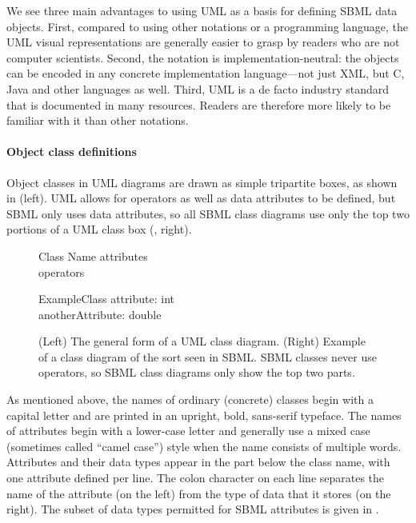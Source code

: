 We see three main advantages to using UML as a basis for defining
SBML data objects.  First, compared to using other notations or
a programming language, the UML visual representations are
generally easier to grasp by readers who are not computer
scientists.  Second, the notation is implementation-neutral: the
objects can be encoded in any concrete implementation
language---not just XML, but C, Java and other languages as well.
Third, UML is a de facto industry standard that is documented in
many resources.  Readers are therefore more likely to be familiar
with it than other notations.


\paragraph{Object class definitions}

Object classes in UML diagrams are drawn as simple tripartite
boxes, as shown in  (left).  UML
allows for operators as well as data attributes to be defined,
but SBML only uses data attributes, so all SBML class diagrams use
only the top two portions of a UML class box
(, right).

\begin{figure}[htb]
  \vspace*{1ex}
  \centering
  \small
  \begin{classbox}{Class Name}
    attributes\\
    \hline
    operators\\
  \end{classbox}
  \quad  \quad  \quad  \quad
  \begin{classbox}{ExampleClass}
    attribute: int \\
    anotherAttribute: double\\
  \end{classbox}
  \caption{(Left) The general form of a UML class
      diagram.  (Right) Example of a class diagram of the sort
      seen in SBML.  SBML classes never use operators, so SBML
      class diagrams only show the top two parts.}
  \label{fig:simple-class-eg}
\end{figure}

As mentioned above, the names of ordinary (concrete) classes begin
with a capital letter and are printed in an upright,
bold, sans-serif typeface.  The names of attributes
begin with a lower-case letter and generally use a mixed case
(sometimes called ``camel case'') style when the name consists of
multiple words.  Attributes and their data types appear in the
part below the class name, with one attribute defined per line.
The colon character on each line separates the name of the
attribute (on the left) from the type of data that it stores (on
the right).  The subset of data types permitted for SBML
attributes is given in .

